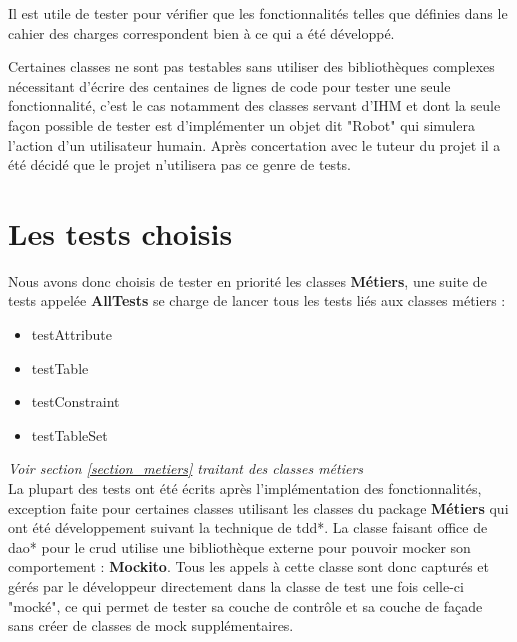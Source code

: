Il est utile de tester pour vérifier que les fonctionnalités telles que définies dans le cahier des charges correspondent bien à ce qui a été développé.

Certaines classes ne sont pas testables sans utiliser des bibliothèques complexes nécessitant d'écrire des centaines de lignes de code pour tester une seule fonctionnalité, c'est le cas notamment des classes servant d'IHM et dont la seule façon possible de tester est d'implémenter un objet dit "Robot" qui simulera l'action d'un utilisateur humain. Après concertation avec le tuteur du projet il a été décidé que le projet n'utilisera pas ce genre de tests.

\section{Les tests choisis}

Nous avons donc choisis de tester en priorité les classes \textbf{Métiers}, une suite de tests appelée \textbf{AllTests} se charge  de lancer tous les tests liés aux classes métiers : 
\\

\begin{itemize}
	\item testAttribute
	\item testTable
	\item testConstraint
	\item testTableSet
\end{itemize}

\textit{Voir section \ref{section_metiers} traitant des classes métiers}
\\


La plupart des tests ont été écrits après l'implémentation des fonctionnalités, exception faite pour certaines classes utilisant les classes du package \textbf{Métiers} qui ont été développement suivant la technique de \gls{tdd}*.
\medbreak
La classe faisant office de \gls{dao}* pour le \gls{crud} utilise une bibliothèque externe pour pouvoir mocker son comportement : \textbf{Mockito}. Tous les appels à cette classe sont donc capturés et gérés par le développeur directement dans la classe de test une fois celle-ci "mocké", ce qui permet de tester sa couche de contrôle et sa couche de façade sans créer de classes de \gls{mock} supplémentaires.


